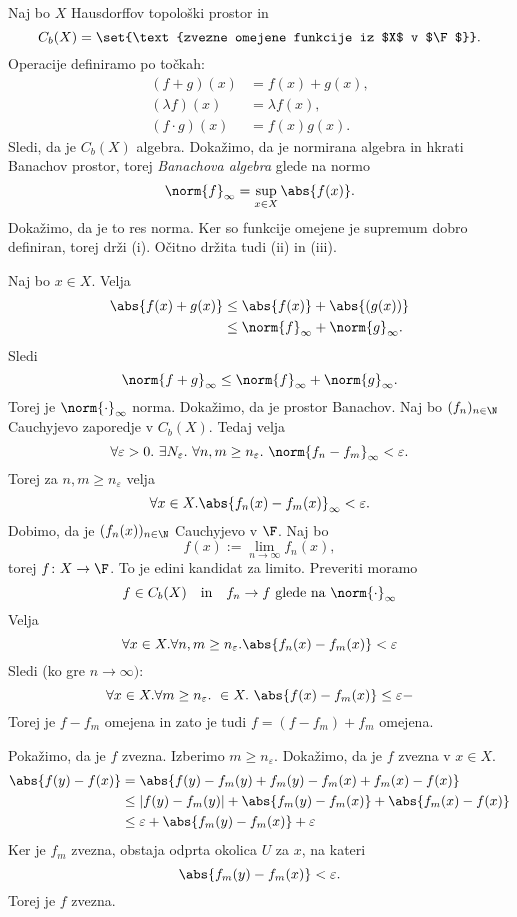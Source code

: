 \begin{primer}
    Naj bo $X$ Hausdorffov topološki prostor in
    \[
        C_b(X) =\set{\text{zvezne omejene funkcije iz $X$ v $\F$}}.
    \]
    Operacije definiramo po točkah:
    \begin{align*}
        (f+g)(x) &= f(x) + g(x), \\
        (\lambda f)(x) &= \lambda f(x), \\
        (f\cdot g)(x) &= f(x) g(x).
    \end{align*}
    Sledi, da je $C_b(X)$ algebra. Dokažimo, da 
    je normirana algebra in hkrati Banachov prostor, 
    torej \emph{Banachova algebra} 
    glede na normo
    \[
        \norm{f}_\infty = \sup_{x \in X} \abs{f(x)}.
    \]
    Dokažimo, da je to res norma. 
    Ker so funkcije omejene je supremum dobro definiran, 
    torej drži (i). Očitno držita tudi (ii) in (iii).

    Naj bo $x \in X$. Velja
    \begin{align*}
        \abs{f(x) + g(x)} &\le \abs{f(x)} + \abs{(g(x))} \\
        &\le \norm{f}_\infty + \norm{g}_\infty.
    \end{align*}
    Sledi
    \[
        \norm{f + g}_\infty \le \norm{f}_\infty + \norm{g}_\infty.
    \]
    Torej je $\norm{\cdot}_\infty$ norma. Dokažimo, da je prostor Banachov.
    Naj bo $(f_n)_{n \in \N}$ Cauchyjevo zaporedje v $C_b(X)$. Tedaj velja
    \[
        \forall \varepsilon > 0.~\exists N_\varepsilon.~\forall n,m \ge n_\varepsilon.~
        \norm{f_n - f_m}_\infty < \varepsilon.
    \]
    Torej za $n,m \ge n_\varepsilon$ velja
    \[
        \forall x \in X. \abs{f_n(x) - f_m(x)}_\infty < \varepsilon.
    \]
    Dobimo, da je $(f_n(x))_{n\in\N}$ Cauchyjevo v $\F$.
    Naj bo
    \[
        f(x) := \lim_{n\to \infty} f_n(x),
    \]
    torej $f \colon X \to \F$. To je edini kandidat za limito. Preveriti moramo
    \[
        f \in C_b(X) \quad \text{in} \quad f_n \to f \text{ glede na $\norm{\cdot}_\infty$}
    \]
    Velja
    \[
        \forall x \in X. \forall n,m \ge n_\varepsilon. \abs{f_n(x) - f_m(x)} < \varepsilon
    \]
    Sledi (ko gre $n \to \infty)$: 
    \begin{equation}
        \forall x \in X. \forall m \ge n_\varepsilon.~\in X.~\abs{f(x) - f_m(x)} \le \varepsilon-
    \end{equation}
    Torej je $f - f_m$ omejena in zato je tudi $f = (f - f_m) + f_m$ omejena.

    Pokažimo, da je $f$ zvezna.
    Izberimo $m \ge n_\varepsilon$. Dokažimo, da je $f$ zvezna 
    v $x \in X$.
    \begin{align*}
        \abs{f(y)-f(x)} &= \abs{f(y)-f_m(y)+f_m(y)-f_m(x)+f_m(x)-f(x)} \\
        &\le |f(y) - f_m(y)| + \abs{f_m(y) - f_m(x)} + \abs{f_m(x) - f(x)} \\
        &\le \varepsilon + \abs{f_m(y) - f_m(x)} + \varepsilon    
    \end{align*}
    Ker je $f_m$ zvezna, obstaja odprta okolica $U$ za $x$, 
    na kateri 
    \[
        \abs{f_m(y) - f_m(x)} < \varepsilon.
    \]
    Torej je $f$ zvezna. 


\end{primer}
